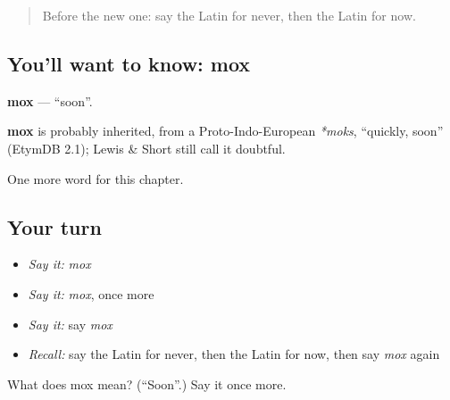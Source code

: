 \begin{quote}
Before the new one: say the Latin for never, then the Latin for now.
\end{quote}

\subsection*{You'll want to know: mox}
\textbf{mox} — \textquotedblleft{}soon\textquotedblright{}.

\begin{cousinweb}
\textbf{mox} is probably inherited, from a Proto-Indo-European \emph{*moks}, \textquotedblleft{}quickly, soon\textquotedblright{} (EtymDB 2.1); Lewis \& Short still call it doubtful.
\end{cousinweb}

\begin{grammarlens}[title={What you've built}]
One more word for this chapter.
\end{grammarlens}

\subsection*{Your turn}
\begin{itemize}
\raggedright
  \item \emph{Say it:} \emph{mox}
  \item \emph{Say it:} \emph{mox}, once more
  \item \emph{Say it:} say \emph{mox}
  \item \emph{Recall:} say the Latin for never, then the Latin for now, then say \emph{mox} again
\end{itemize}

\begin{tcolorbox}[breakable,colback=teal!4,colframe=teal!35!black,title={Before you move on}]
What does mox mean? (\textquotedblleft{}Soon\textquotedblright{}.) Say it once more.
\end{tcolorbox}
